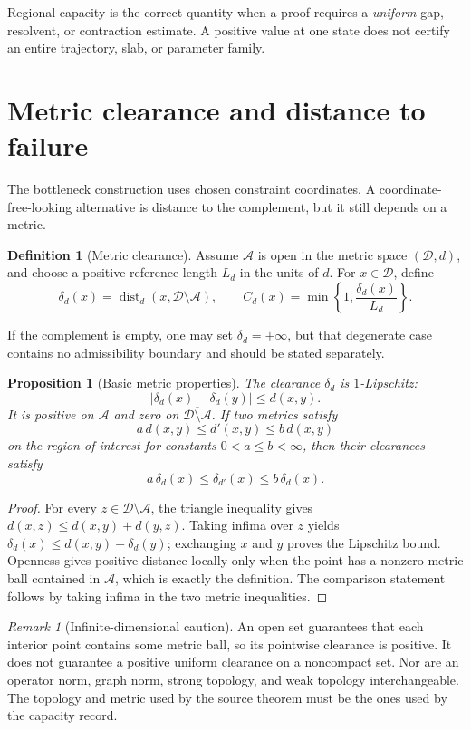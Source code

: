 \documentclass[11pt]{article}
\newtheorem{proposition}[theorem]{Proposition}
\theoremstyle{definition}
\newtheorem{definition}[theorem]{Definition}
\theoremstyle{remark}
\newtheorem{remark}[theorem]{Remark}
\newcommand{\cA}{\mathcal A}
\newcommand{\cD}{\mathcal D}
\newcommand{\dist}{\operatorname{dist}}
\begin{document}
Regional capacity is the correct quantity when a proof requires a
\emph{uniform} gap, resolvent, or contraction estimate.  A positive value at
one state does not certify an entire trajectory, slab, or parameter family.

\section{Metric clearance and distance to failure}
\label{sec:distance}

The bottleneck construction uses chosen constraint coordinates.  A
coordinate-free-looking alternative is distance to the complement, but it
still depends on a metric.

\begin{definition}[Metric clearance]
\label{def:clearance}
Assume \(\cA\) is open in the metric space \((\cD,d)\), and choose a positive
reference length \(L_d\) in the units of \(d\).  For \(x\in\cD\), define
\[
 \delta_d(x)=\dist_d(x,\cD\setminus\cA),
 \qquad
 C_d(x)=\min\left\{1,\frac{\delta_d(x)}{L_d}\right\}.
\]
\end{definition}

If the complement is empty, one may set \(\delta_d=+\infty\), but that
degenerate case contains no admissibility boundary and should be stated
separately.

\begin{proposition}[Basic metric properties]
\label{prop:distance}
The clearance \(\delta_d\) is \(1\)-Lipschitz:
\[
 |\delta_d(x)-\delta_d(y)|\le d(x,y).
\]
It is positive on \(\cA\) and zero on
\(\overline{\cD\setminus\cA}\).  If two metrics satisfy
\[
 a\,d(x,y)\le d'(x,y)\le b\,d(x,y)
\]
on the region of interest for constants \(0<a\le b<\infty\), then their
clearances satisfy
\[
 a\,\delta_d(x)\le\delta_{d'}(x)\le b\,\delta_d(x).
\]
\end{proposition}

\begin{proof}
For every \(z\in\cD\setminus\cA\), the triangle inequality gives
\(d(x,z)\le d(x,y)+d(y,z)\).  Taking infima over \(z\) yields
\(\delta_d(x)\le d(x,y)+\delta_d(y)\); exchanging \(x\) and \(y\) proves the
Lipschitz bound.  Openness gives positive distance locally only when the
point has a nonzero metric ball contained in \(\cA\), which is exactly the
definition.  The comparison statement follows by taking infima in the two
metric inequalities.
\end{proof}

\begin{remark}[Infinite-dimensional caution]
An open set guarantees that each interior point contains some metric ball,
so its pointwise clearance is positive.  It does not guarantee a positive
uniform clearance on a noncompact set.  Nor are an operator norm, graph
norm, strong topology, and weak topology interchangeable.  The topology and
metric used by the source theorem must be the ones used by the capacity
record.
\end{remark}
\end{document}
